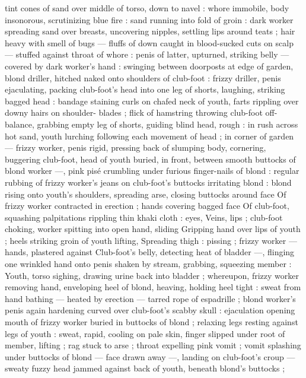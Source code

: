 tint cones of sand over middle of torso, down to navel : whore 
immobile, body insonorous, scrutinizing blue fire : sand running into 
fold of groin : dark worker spreading sand over breasts, uncovering 
nipples, settling lips around teats ; hair heavy with smell of bugs --- 
fluffs of down caught in blood-sucked cuts on scalp --- stuffed 
against throat of whore : penis of latter, upturned, striking belly --- 
covered by dark worker's hand : swinging between doorposts at edge 
of garden, blond driller, hitched naked onto shoulders of club-foot : 
frizzy driller, penis ejaculating, packing club-foot's head into one leg 
of shorts, laughing, striking bagged head : bandage staining curls on 
chafed neck of youth, farts rippling over downy hairs on shoulder- 
blades ; flick of hamstring throwing club-foot off-balance, grabbing 
empty leg of shorts, guiding blind head, rough : in rush across hot 
sand, youth lurching following each movement of head ; in corner of 
garden --- frizzy worker, penis rigid, pressing back of slumping 
body, cornering, buggering club-foot, head of youth buried, in front, 
between smooth buttocks of blond worker ---, pink pisé crumbling 
under furious finger-nails of blond : regular rubbing of frizzy 
worker's jeans on club-foot's buttocks irritating blond : blond rising 
onto youth's shoulders, spreading arse, closing buttocks around face 
Of frizzy worker contracted in erection ; hands covering bagged face 
Of club-foot, squashing palpitations rippling thin khaki cloth : eyes, 
Veins, lips ; club-foot choking, worker spitting into open hand, sliding 
Gripping hand over lips of youth ; heels striking groin of youth lifting, 
Spreading thigh : pissing ; frizzy worker --- hands, plastered against 
Club-foot's belly, detecting heat of bladder ---, flinging one wrinkled 
hand onto penis shaken by stream, grabbing, squeezing member : 
Youth, torso sighing, drawing urine back into bladder ; whereupon, 
frizzy worker removing hand, enveloping heel of blond, heaving, 
holding heel tight : sweat from hand bathing --- heated by erection 
--- tarred rope of espadrille ; blond worker's penis again hardening 
curved over club-foot's scabby skull : ejaculation opening mouth of 
frizzy worker buried in buttocks of blond ; relaxing legs resting 
against legs of youth : sweat, rapid, cooling on pale skin, finger 
slipped under root of member, lifting ; rag stuck to arse ; throat 
expelling pink vomit ; vomit splashing under buttocks of blond --- 
face drawn away ---, landing on club-foot's croup --- sweaty fuzzy 
head jammed against back of youth, beneath blond's buttocks ; 
